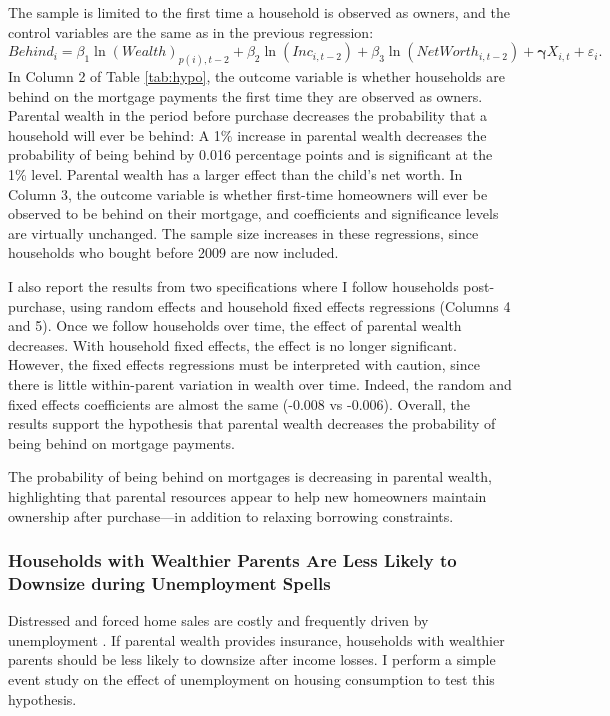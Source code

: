 \documentclass[12pt]{article}
\begin{document}
The sample is limited to the first time a household is observed as owners, and the control variables are the same as in the previous regression:
\begin{equation*}
Behind_i = \beta_1 \ln(Wealth)_{p(i),t-2} + \beta_2 \ln(Inc_{i,t-2}) + \beta_3 \ln(NetWorth_{i,t-2}) + \mathbf{\gamma}{X_{i,t}} + \varepsilon_{i}.
\end{equation*}
In Column 2 of Table \ref{tab:hypo}, the outcome variable is whether households are behind on the mortgage payments the first time they are observed as owners. Parental wealth in the period before purchase decreases the probability that a household will ever be behind: A 1\% increase in parental wealth decreases the probability of being behind by 0.016 percentage points and is significant at the 1\% level. Parental wealth has a larger effect than the child's net worth. In Column 3, the outcome variable is whether first-time homeowners will ever be observed to be behind on their mortgage, and coefficients and significance levels are virtually unchanged. The sample size increases in these regressions, since households who bought before 2009 are now included.

I also report the results from two specifications where I follow households post-purchase, using random effects and household fixed effects regressions (Columns 4 and 5). Once we follow households over time, the effect of parental wealth decreases. With household fixed effects, the effect is no longer significant. However, the fixed effects regressions must be interpreted with caution, since there is little within-parent variation in wealth over time. Indeed, the random and fixed effects coefficients are almost the same (-0.008 vs -0.006). Overall, the results support the hypothesis that parental wealth decreases the probability of being behind on mortgage payments.

The probability of being behind on mortgages is decreasing in parental wealth, highlighting that parental resources appear to help new homeowners maintain ownership after purchase---in addition to relaxing borrowing constraints.

\subsubsection{Households with Wealthier Parents Are Less Likely to Downsize during Unemployment Spells}\label{sec:eventstudy}
Distressed and forced home sales are costly and frequently driven by unemployment \citep{kermani2021racial,hsu2018unemployment}. If parental wealth provides insurance, households with wealthier parents should be less likely to downsize after income losses. I perform a simple event study on the effect of unemployment on housing consumption to test this hypothesis.
\end{document}
